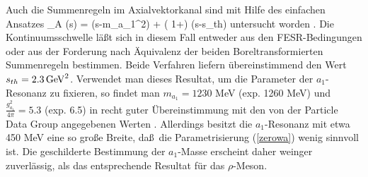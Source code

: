 Auch die Summenregeln im Axialvektorkanal sind mit Hilfe des einfachen 
Ansatzes 
\be
\label{zerowa}
 \rho_A (s) =  \delta (s-m_{a_1}^2)
   + \left( 1+\right) \Theta (s-s_{th})
\ee	      
untersucht worden \cite{RRY85}. Die Kontinuumsschwelle l\"a\ss t sich
in diesem Fall entweder aus den FESR-Bedingungen oder aus der
Forderung nach \"Aquivalenz der beiden Boreltransformierten 
Summenregeln bestimmen. Beide Verfahren liefern \"ubereinstimmend
den Wert $s_{th}=2.3\,{\rm GeV}^2$. Verwendet man dieses Resultat,
um die Parameter der $a_1$-Resonanz zu fixieren, so findet
man $m_{a_1}=1230$ MeV (exp. 1260 MeV) und $\frac{g_{a_1}^2}{4\pi}=5.3$ 
(exp. 6.5) in recht guter \"Ubereinstimmung  mit den von der Particle 
Data Group angegebenen Werten \cite{PDG90}. Allerdings besitzt die 
$a_1$-Resonanz mit etwa 450 MeV eine so gro\ss e Breite, da\ss\ die 
Parametrisierung (\ref{zerowa}) wenig sinnvoll ist. Die geschilderte
Bestimmung der $a_1$-Masse erscheint daher weinger zuverl\"assig, als
das entsprechende Resultat f\"ur das $\rho$-Meson.
 
